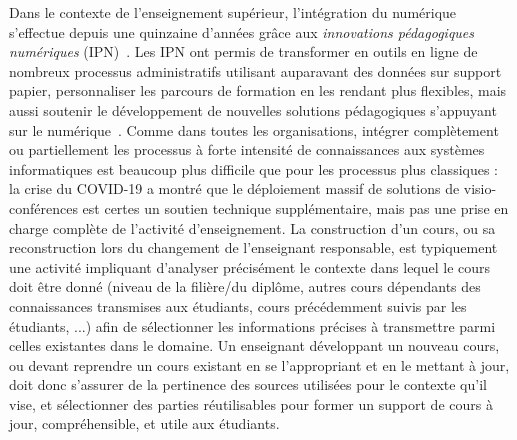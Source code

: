 \bigskip

Dans le contexte de l'enseignement supérieur, l'intégration du numérique s'effectue depuis une quinzaine d'années grâce aux \textit{innovations pédagogiques numériques} (IPN)~\cite{dulbecco2018innovations}.
Les IPN ont permis de transformer en outils en ligne de nombreux processus administratifs utilisant auparavant des données sur support papier, personnaliser les parcours de formation en les rendant plus flexibles, mais aussi soutenir le développement de nouvelles solutions pédagogiques s'appuyant sur le numérique~\cite{dulbecco2019experimentation}.
Comme dans toutes les organisations, intégrer complètement ou partiellement les processus à forte intensité de connaissances aux systèmes informatiques est beaucoup plus difficile que pour les processus plus classiques : la crise du COVID-19 a montré que le déploiement massif de solutions de visio-conférences est certes un soutien technique supplémentaire, mais pas une prise en charge complète de l'activité d'enseignement.
La construction d'un cours, ou sa reconstruction lors du changement de l'enseignant responsable, est typiquement une activité impliquant d'analyser précisément le contexte dans lequel le cours doit être donné (niveau de la filière/du diplôme, autres cours dépendants des connaissances transmises aux étudiants, cours précédemment suivis par les étudiants, ...) afin de sélectionner les informations précises à transmettre parmi celles existantes dans le domaine.
Un enseignant développant un nouveau cours, ou devant reprendre un cours existant en se l'appropriant et en le mettant à jour, doit donc s'assurer de la pertinence des sources utilisées pour le contexte qu'il vise, et sélectionner des parties réutilisables pour former un support de cours à jour, compréhensible, et utile aux étudiants.

\bigskip

